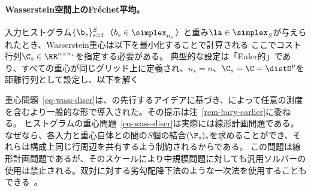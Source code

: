 \paragraph{Wasserstein空間上のFréchet平均。}

入力ヒストグラム$\{\b_s\}_{s=1}^S$（$b_s \in \simplex_{n_s}$）と重み$\la \in \simplex_S$が与えられたとき、Wasserstein重心は以下を最小化することで計算される
ここでコスト行列$\C_s \in \RR^{n \times n_s}$を指定する必要がある。
%
典型的な設定は「Euler的」であり、すべての重心が同じグリッド上に定義され、$n_s=n$、$\C_s=\C=\distD^p$を距離行列として設定し、以下を解く

重心問題~\eqref{eq-wass-discr}は、\citet{carlierekelandmatching}の先行するアイデアに基づき、\citet{Carlier_wasserstein_barycenter}によって任意の測度を含むより一般的な形で導入された。その提示は注~\ref{rem-bary-carlier}に委ねる。%
ヒストグラムの重心問題~\eqref{eq-wass-discr}は実際には線形計画問題である。なぜなら、各入力と重心自体との間の$S$個の結合$(\P_s)_s$を求めることができ、それらは構成上同じ行周辺を共有するよう制約されるからである。
この問題は線形計画問題であるが、そのスケールにより中規模問題に対しても汎用ソルバーの使用は禁止される。双対に対する劣勾配降下法のような一次法を使用することもできる~\citep{Carlier-NumericsBarycenters}。

